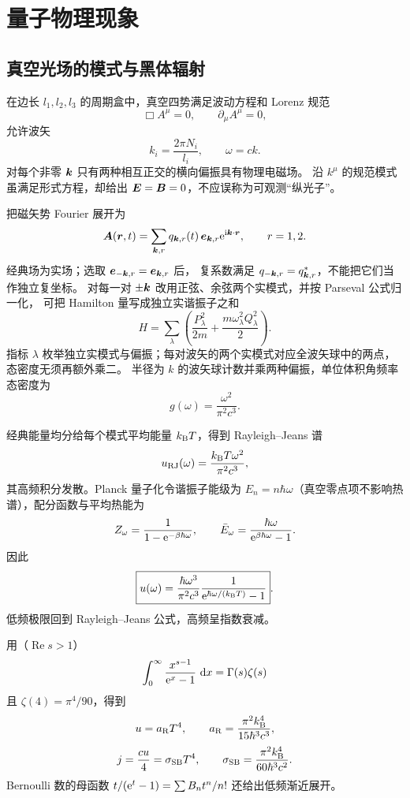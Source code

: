 \section{量子物理现象}

\subsection{真空光场的模式与黑体辐射}

在边长 $l_1,l_2,l_3$ 的周期盒中，真空四势满足波动方程和 Lorenz 规范
\[
 \Box A^\mu=0,\qquad \partial_\mu A^\mu=0,
\]
允许波矢
\[
 k_i=\frac{2\pi N_i}{l_i},\qquad
 \omega=ck.
\]
对每个非零 $\bm{k}$ 只有两种相互正交的横向偏振具有物理电磁场。
沿 $k^\mu$ 的规范模式虽满足形式方程，却给出 $\bm{E}=\bm{B}=0$，不应误称为可观测“纵光子”。

把磁矢势 Fourier 展开为
\[
 \bm{A}(\bm{r},t)=
 \sum_{\bm{k},r}q_{\bm{k},r}(t)\,
 \bm{e}_{\bm{k},r}\mathrm e^{\mathrm i\bm{k}\cdot\bm{r}},
\qquad r=1,2.
\]
经典场为实场；选取 $\bm{e}_{-\bm{k},r}=\bm{e}_{\bm{k},r}$ 后，
复系数满足 $q_{-\bm{k},r}=q_{\bm{k},r}^*$，不能把它们当作独立复坐标。
对每一对 $\pm\bm{k}$ 改用正弦、余弦两个实模式，并按 Parseval 公式归一化，
可把 Hamilton 量写成独立实谐振子之和
\[
 H=\sum_{\lambda}
 \left(\frac{P_{\lambda}^2}{2m}
 +\frac{m\omega_{\lambda}^2Q_{\lambda}^2}{2}\right).
\]
指标 $\lambda$ 枚举独立实模式与偏振；每对波矢的两个实模式对应全波矢球中的两点，态密度无须再额外乘二。
半径为 $k$ 的波矢球计数并乘两种偏振，单位体积角频率态密度为
\[
 \boxed{g(\omega)=\frac{\omega^2}{\pi^2c^3}}.
\]

经典能量均分给每个模式平均能量 $k_{\rm B}T$，得到 Rayleigh--Jeans 谱
\[
 u_{\rm RJ}(\omega)=\frac{k_{\rm B}T\omega^2}{\pi^2c^3},
\]
其高频积分发散。Planck 量子化令谐振子能级为
$E_n=n\hbar\omega$（真空零点项不影响热谱），配分函数与平均热能为
\[
 Z_\omega=\frac1{1-\mathrm e^{-\beta\hbar\omega}},\qquad
 \bar E_\omega=\frac{\hbar\omega}{\mathrm e^{\beta\hbar\omega}-1}.
\]
因此
\[
 \boxed{u(\omega)=
 \frac{\hbar\omega^3}{\pi^2c^3}
 \frac1{\mathrm e^{\hbar\omega/(k_{\rm B}T)}-1}}.
\]
低频极限回到 Rayleigh--Jeans 公式，高频呈指数衰减。

用（$\operatorname{Re}s>1$）
\[
 \int_0^\infty\frac{x^{s-1}}{\mathrm e^x-1}\,\mathop{}\!\mathrm d x
 =\Gamma(s)\zeta(s)
\]
且 $\zeta(4)=\pi^4/90$，得到
\[
 u=a_{\rm R}T^4,\qquad
 a_{\rm R}=\frac{\pi^2k_{\rm B}^4}{15\hbar^3c^3},
\]
\[
 j=\frac{cu}{4}=\sigma_{\rm SB}T^4,\qquad
 \sigma_{\rm SB}=
 \frac{\pi^2k_{\rm B}^4}{60\hbar^3c^2}.
\]
Bernoulli 数的母函数
$t/(\mathrm e^t-1)=\sum B_nt^n/n!$
还给出低频渐近展开。

